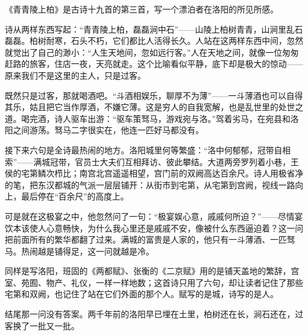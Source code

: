 \begin{appreciation}
《青青陵上柏》是古诗十九首的第三首，写一个漂泊者在洛阳的所见所感。

诗从两样东西写起：“青青陵上柏，磊磊涧中石”——山陵上柏树青青，山涧里乱石磊磊。柏树耐寒，石头不朽，它们都比人活得长久。人站在这两样东西中间，忽然就觉出了自己的渺小：“人生天地间，忽如远行客。”人在天地之间，就像一位匆匆赶路的旅客，住店一夜，天亮就走。这个比喻看似平静，底下却是极大的惊动——原来我们不是这里的主人，只是过客。

既然只是过客，那就喝酒吧。“斗酒相娱乐，聊厚不为薄”——一斗薄酒也可以自得其乐，姑且把它当作厚酒，不嫌它薄。这是穷人的自我宽解，也是乱世里的处世之道。喝完酒，诗人驱车出游：“驱车策驽马，游戏宛与洛。”驾着劣马，在宛县和洛阳之间游荡。驽马二字很实在，他连一匹好马都没有。

接下来六句是全诗最热闹的地方。洛阳城里何等繁盛：“洛中何郁郁，冠带自相索”——满城冠带，官员士大夫们互相拜访、彼此攀结。大道两旁罗列着小巷，王侯的宅第鳞次栉比；南宫北宫遥遥相望，宫门前的双阙高达百余尺。诗人用极省净的笔，把东汉都城的气派一层层铺开：从街市到宅第，从宅第到宫阙，视线一路向上，最后停在“百余尺”的高度上。

可是就在这极宴之中，他忽然问了一句：“极宴娱心意，戚戚何所迫？”——尽情宴饮本该使人心意畅快，为什么我心里还是戚戚不安，像被什么东西逼迫着？这一问把前面所有的繁华都翻了过来。满城的富贵是人家的，他只有一斗薄酒、一匹驽马。热闹越是铺得足，这一问就越是冷。

同样是写洛阳，班固的《两都赋》、张衡的《二京赋》用的是铺天盖地的繁辞，宫室、苑囿、物产、礼仪，一样一样地数；这首诗只用了六句，却让读者记住了那些宅第和双阙，也记住了站在它们外面的那个人。赋写的是城，诗写的是人。

结尾那一问没有答案。两千年前的洛阳早已埋在土里，柏树还在长，涧石还在，过客换了一批又一批。
\end{appreciation}
